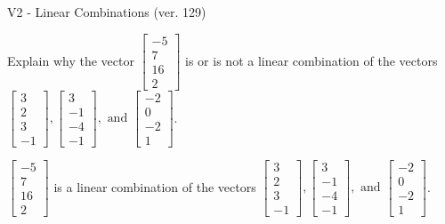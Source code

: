 \begin{exercise}
  \begin{exerciseTitle}V2 - Linear Combinations (ver. 129)\end{exerciseTitle}
  \begin{exerciseStatement}
    Explain why the vector \(\left[\begin{array}{c}
-5 \\
7 \\
16 \\
2
\end{array}\right]\)  is or is not a linear 
	combination of the vectors \(\left[\begin{array}{c}
3 \\
2 \\
3 \\
-1
\end{array}\right] , \left[\begin{array}{c}
3 \\
-1 \\
-4 \\
-1
\end{array}\right] , \text{ and } \left[\begin{array}{c}
-2 \\
0 \\
-2 \\
1
\end{array}\right]\).
	


  \end{exerciseStatement}
  \begin{exerciseAnswer}
   \(\left[\begin{array}{c}
-5 \\
7 \\
16 \\
2
\end{array}\right]\) 
  	 is  
	a linear combination of the vectors \(\left[\begin{array}{c}
3 \\
2 \\
3 \\
-1
\end{array}\right] , \left[\begin{array}{c}
3 \\
-1 \\
-4 \\
-1
\end{array}\right] , \text{ and } \left[\begin{array}{c}
-2 \\
0 \\
-2 \\
1
\end{array}\right]\).

	
  


  \end{exerciseAnswer}
\end{exercise}